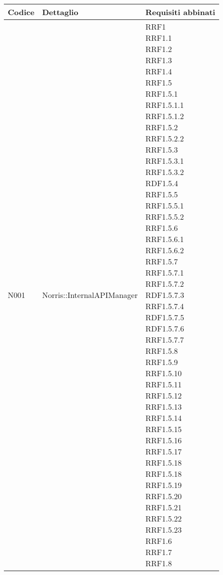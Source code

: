 
				\begin{longtabu} spread 1cm [c]{|X[l]|X[l]|X[l]|}
					\hline
					\rowfont{\bf \centering}
					Codice &
					Dettaglio &
					Requisiti abbinati \\
					\hline
					\endhead
					
					N001 & Norris::InternalAPIManager & \parbox[t]{4cm}{ RRF1 \\ RRF1.1 \\ RRF1.2 \\ RRF1.3 \\ RRF1.4 \\ RRF1.5 \\ RRF1.5.1 \\ RRF1.5.1.1 \\ RRF1.5.1.2 \\ RRF1.5.2 \\ RRF1.5.2.2 \\ RRF1.5.3 \\ RRF1.5.3.1 \\ RRF1.5.3.2 \\ RDF1.5.4 \\ RRF1.5.5 \\ RRF1.5.5.1 \\ RRF1.5.5.2 \\ RRF1.5.6 \\ RRF1.5.6.1 \\ RRF1.5.6.2 \\ RRF1.5.7 \\ RRF1.5.7.1 \\ RRF1.5.7.2 \\ RDF1.5.7.3 \\ RRF1.5.7.4 \\ RDF1.5.7.5 \\ RDF1.5.7.6 \\ RRF1.5.7.7 \\ RRF1.5.8 \\ RRF1.5.9 \\ RRF1.5.10 \\ RRF1.5.11 \\ RRF1.5.12 \\ RRF1.5.13 \\ RRF1.5.14 \\ RRF1.5.15 \\ RRF1.5.16 \\ RRF1.5.17 \\ RRF1.5.18 \\ RRF1.5.18 \\ RRF1.5.19 \\ RRF1.5.20 \\ RRF1.5.21 \\ RRF1.5.22 \\ RRF1.5.23 \\ RRF1.6 \\ RRF1.7 \\ RRF1.8} \\ \hline

\end{longtabu}
